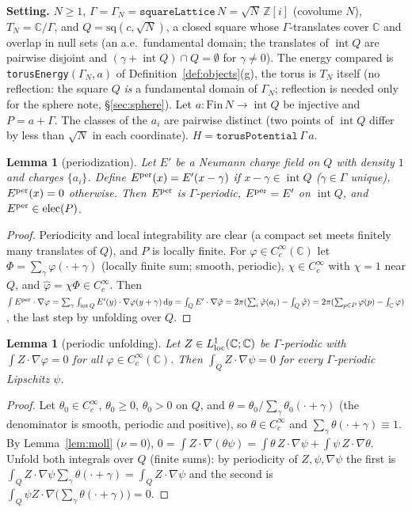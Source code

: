 \documentclass[11pt]{article}
\newtheorem{lemma}[theorem]{Lemma}
\theoremstyle{definition}
\theoremstyle{remark}
\newcommand{\C}{\mathbb C}
\newcommand{\Z}{\mathbb Z}
\newcommand{\dd}{\,\mathrm d}
\newcommand{\sq}{\mathrm{sq}}
\begin{document}
\textbf{Setting.} $N\ge1$, $\Gamma=\Gamma_N=\texttt{squareLattice}\,N=\sqrt N\,\Z[i]$ (covolume $N$), $T_N=\C/\Gamma$, and $Q=\sq(c,\sqrt N)$, a closed square whose
$\Gamma$-translates cover $\C$ and overlap in null sets (an a.e.\ fundamental domain; the translates of $\operatorname{int}Q$ are pairwise disjoint and
$(\gamma+\operatorname{int}Q)\cap Q=\emptyset$ for $\gamma\ne0$). The energy compared is \texttt{torusEnergy}$(\Gamma_N,a)$ of
Definition~\ref{def:objects}(g), the torus is $T_N$ itself (no reflection: the square $Q$ \emph{is} a fundamental domain of $\Gamma_N$; reflection is needed
only for the sphere note, \S\ref{sec:sphere}). Let $a:\mathrm{Fin}\,N\to\operatorname{int}Q$ be injective and $P=a+\Gamma$. The classes of the $a_i$ are pairwise distinct
(two points of $\operatorname{int}Q$ differ by less than $\sqrt N$ in each coordinate). $H=\texttt{torusPotential}\,\Gamma\,a$.

\begin{lemma}[periodization]\label{lem:period}
Let $E'$ be a Neumann charge field on $Q$ with density $1$ and charges $\{a_i\}$. Define $E^{\rm per}(x)=E'(x-\gamma)$ if $x-\gamma\in\operatorname{int}Q$
($\gamma\in\Gamma$ unique), $E^{\rm per}(x)=0$ otherwise. Then $E^{\rm per}$ is $\Gamma$-periodic, $E^{\rm per}=E'$ on $\operatorname{int}Q$, and
$E^{\rm per}\in\mathrm{elec}(P)$.
\end{lemma}
\begin{proof}
Periodicity and local integrability are clear (a compact set meets finitely many translates of $Q$), and $P$ is locally finite. For $\varphi\in C^\infty_c(\C)$ let
$\Phi=\sum_\gamma\varphi(\cdot+\gamma)$ (locally finite sum; smooth, periodic), $\chi\in C^\infty_c$ with $\chi=1$ near $Q$, and $\hat\varphi=\chi\Phi\in C_c^\infty$.
Then $\int E^{\rm per}\cdot\nabla\varphi=\sum_\gamma\int_{\operatorname{int}Q}E'(y)\cdot\nabla\varphi(y+\gamma)\dd y=\int_QE'\cdot\nabla\hat\varphi
=2\pi(\sum_i\hat\varphi(a_i)-\int_Q\hat\varphi)=2\pi(\sum_{p\in P}\varphi(p)-\int_\C\varphi)$, the last step by unfolding over $Q$.
\end{proof}

\begin{lemma}[periodic unfolding]\label{lem:unfold}
Let $Z\in L^1_{\rm loc}(\C;\C)$ be $\Gamma$-periodic with $\int Z\cdot\nabla\varphi=0$ for all $\varphi\in C^\infty_c(\C)$. Then $\int_QZ\cdot\nabla\psi=0$ for every
$\Gamma$-periodic Lipschitz $\psi$.
\end{lemma}
\begin{proof}
Let $\theta_0\in C_c^\infty$, $\theta_0\ge0$, $\theta_0>0$ on $Q$, and $\theta=\theta_0/\sum_\gamma\theta_0(\cdot+\gamma)$ (the denominator is smooth, periodic and positive), so
$\theta\in C^\infty_c$ and $\sum_\gamma\theta(\cdot+\gamma)\equiv1$. By Lemma~\ref{lem:moll} ($\nu=0$), $0=\int Z\cdot\nabla(\theta\psi)=\int\theta\,Z\cdot\nabla\psi+\int\psi\,Z\cdot\nabla\theta$.
Unfold both integrals over $Q$ (finite sums): by periodicity of $Z,\psi,\nabla\psi$ the first is $\int_QZ\cdot\nabla\psi\sum_\gamma\theta(\cdot+\gamma)=\int_QZ\cdot\nabla\psi$ and the second
is $\int_Q\psi Z\cdot\nabla\bigl(\sum_\gamma\theta(\cdot+\gamma)\bigr)=0$.
\end{proof}
\end{document}
